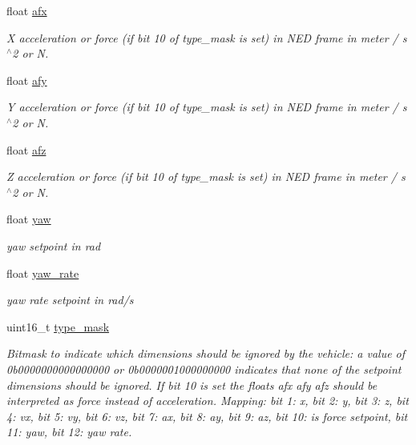 \begin{DoxyCompactItemize}
float \hyperlink{struct____mavlink__set__position__target__local__ned__t_af5b34145d47ec264f640fdaeaad35a99}{afx}
\begin{DoxyCompactList}\small\item\em X acceleration or force (if bit 10 of type\+\_\+mask is set) in N\+E\+D frame in meter / s$^\wedge$2 or N. \end{DoxyCompactList}\item 
float \hyperlink{struct____mavlink__set__position__target__local__ned__t_ad110886eb30fa38fc2e37fbd57eefc11}{afy}
\begin{DoxyCompactList}\small\item\em Y acceleration or force (if bit 10 of type\+\_\+mask is set) in N\+E\+D frame in meter / s$^\wedge$2 or N. \end{DoxyCompactList}\item 
float \hyperlink{struct____mavlink__set__position__target__local__ned__t_a4af3525071d759e517d6ee12f1a1e7e2}{afz}
\begin{DoxyCompactList}\small\item\em Z acceleration or force (if bit 10 of type\+\_\+mask is set) in N\+E\+D frame in meter / s$^\wedge$2 or N. \end{DoxyCompactList}\item 
float \hyperlink{struct____mavlink__set__position__target__local__ned__t_a528a6e874a219976d5e0f69e7056ecc5}{yaw}
\begin{DoxyCompactList}\small\item\em yaw setpoint in rad \end{DoxyCompactList}\item 
float \hyperlink{struct____mavlink__set__position__target__local__ned__t_a45f79f5934d23e81cb7a3012e6d43bdd}{yaw\+\_\+rate}
\begin{DoxyCompactList}\small\item\em yaw rate setpoint in rad/s \end{DoxyCompactList}\item 
uint16\+\_\+t \hyperlink{struct____mavlink__set__position__target__local__ned__t_a7aef320f429808ebbc6df07ffe12b426}{type\+\_\+mask}
\begin{DoxyCompactList}\small\item\em Bitmask to indicate which dimensions should be ignored by the vehicle\+: a value of 0b0000000000000000 or 0b0000001000000000 indicates that none of the setpoint dimensions should be ignored. If bit 10 is set the floats afx afy afz should be interpreted as force instead of acceleration. Mapping\+: bit 1\+: x, bit 2\+: y, bit 3\+: z, bit 4\+: vx, bit 5\+: vy, bit 6\+: vz, bit 7\+: ax, bit 8\+: ay, bit 9\+: az, bit 10\+: is force setpoint, bit 11\+: yaw, bit 12\+: yaw rate. \end{DoxyCompactList}\item 

\end{DoxyCompactItemize}
